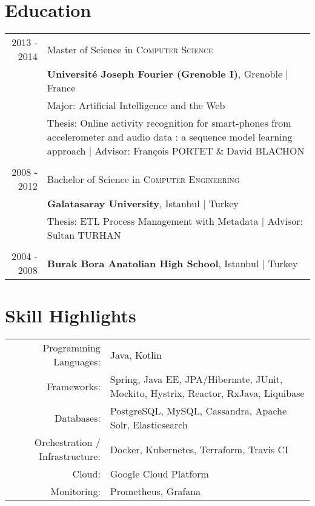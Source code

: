 \documentclass[a4paper,10pt]{article} %
\begin{document}
\section{Education}

\begin{tabular}{r|p{14cm}}

\textsc{2013 - 2014} & Master of Science in \textsc{}\textsc{Computer Science} \\& \normalsize\textbf{Université Joseph Fourier (Grenoble I)}, Grenoble | France\\
&  Major: Artificial Intelligence and the Web\\
& Thesis: Online activity recognition for smart-phones from accelerometer and audio data : a sequence model learning approach | \small Advisor: François \textsc{PORTET} \& David \textsc{BLACHON}  \\
&\\


\textsc{2008 - 2012} & Bachelor of Science in \textsc{}\textsc{Computer Engineering} \\& \normalsize\textbf{Galatasaray University}, Istanbul | Turkey\\
& Thesis: ETL Process Management with Metadata | \small Advisor: Sultan \textsc{TURHAN}\\
&\\


\textsc{2004 - 2008}& \textbf{Burak Bora Anatolian High School}, Istanbul | Turkey
\end{tabular}


\section{Skill Highlights}

\begin{tabular}{r|p{13cm}}
Programming Languages: & Java, Kotlin \\
Frameworks:  & Spring, Java EE, JPA/Hibernate, JUnit, Mockito, Hystrix, Reactor, RxJava, Liquibase \\
Databases: & PostgreSQL, MySQL, Cassandra, Apache Solr, Elasticsearch \\
Orchestration / Infrastructure: & Docker, Kubernetes, Terraform, Travis CI \\
Cloud: & Google Cloud Platform \\
Monitoring: & Prometheus, Grafana \\

\end{tabular}
\end{document}
